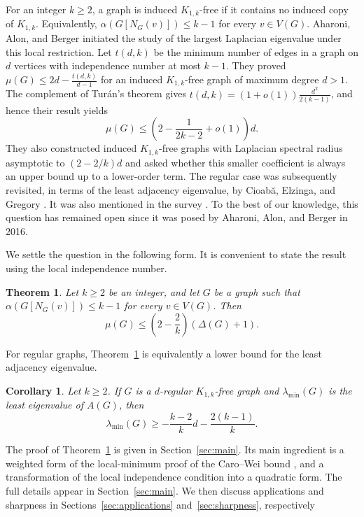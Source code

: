 \documentclass[11pt]{article}
\theoremstyle{plain}
\newtheorem{theorem}{Theorem}[section]
\newtheorem{corollary}{Corollary}[section]
\theoremstyle{definition}
\numberwithin{equation}{section}
\begin{document}
For an integer $k\geq 2$, a graph is  induced $K_{1,k}$-free if it contains no induced
copy of $K_{1,k}$. Equivalently,
$\alpha (G[N_G(v)])\leq k-1$ for every $v\in V(G)$.
Aharoni, Alon, and Berger \cite{AharoniAlonBerger} initiated the study of the
largest Laplacian eigenvalue under this local restriction. Let $t(d,k)$ be
the minimum number of edges in a graph on $d$ vertices with independence
number at most $k-1$. They proved
$\mu(G)\leq 2d-\frac{t(d,k)}{d-1}$
for an induced $K_{1,k}$-free graph of maximum degree $d>1$. The complement of
Tur\'{a}n's theorem \cite{Turan} gives $t(d,k) = (1 + o(1)) \frac{d^2}{2(k-1)}$,
and hence their result yields
\[
\mu(G)\leq \left(2-\frac{1}{2k-2}+o(1)\right) d.
\]
They also constructed induced $K_{1,k}$-free graphs with Laplacian spectral radius
asymptotic to $(2-2/k)d$ and asked whether this smaller coefficient is always
an upper bound up to a lower-order term. The regular case was subsequently
revisited, in terms of the least adjacency eigenvalue, by Cioab\u{a}, Elzinga,
and Gregory \cite{CioabaElzingaGregory}. It was also mentioned in the survey \cite{KoolenCaoYang2011}. 
To the best of our knowledge, this question has remained open since it was 
posed by Aharoni, Alon, and Berger in 2016.

We settle the question in the following form. It is convenient to state
the result using the local independence number.

\begin{theorem}\label{thm:main}
Let $k\geq 2$ be an integer, and let $G$ be a graph such that
$\alpha (G[N_G(v)])\leq k-1$ for every $v\in V(G)$. Then
\[
\mu(G)\leq \left(2-\frac{2}{k}\right) (\Delta(G) + 1).
\]
\end{theorem}

For regular graphs, Theorem~\ref{thm:main} is equivalently a lower bound for
the least adjacency eigenvalue.

\begin{corollary}\label{cor:least}
Let $k\geq 2$. If $G$ is a $d$-regular $K_{1,k}$-free graph and $\lambda_{\min}(G)$ is the
least eigenvalue of $A(G)$, then
\[
\lambda_{\min}(G)\geq -\frac{k-2}{k} d - \frac{2(k-1)}{k}.
\]
\end{corollary}

The proof of Theorem~\ref{thm:main} is given in Section~\ref{sec:main}.  
Its main ingredient is a weighted form of the local-minimum proof of the
Caro--Wei bound \cite{Caro,Wei}, and a transformation of the local 
independence condition into a quadratic form. The full details appear 
in Section~\ref{sec:main}. We then discuss applications and sharpness in Sections~\ref{sec:applications} and~\ref{sec:sharpness}, respectively
\end{document}
